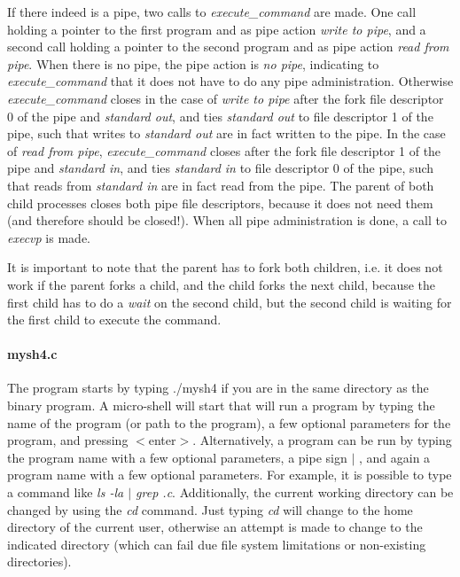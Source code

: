 \documentclass[a4paper,10pt]{article}
\begin{document}
If there indeed is a pipe, two calls to \emph{execute\_command} are made. One call holding a pointer to the first program and as pipe action \emph{write to pipe}, and a second call holding a pointer to the second program and as pipe action \emph{read from pipe}. When there is no pipe, the pipe action is \emph{no pipe}, indicating to \emph{execute\_command} that it does not have to do any pipe administration. Otherwise \emph{execute\_command} closes in the case of \emph{write to pipe} after the fork file descriptor 0 of the pipe and \emph{standard out}, and ties \emph{standard out} to file descriptor 1 of the pipe, such that writes to \emph{standard out} are in fact written to the pipe. In the case of \emph{read from pipe}, \emph{execute\_command} closes after the fork file descriptor 1 of the pipe and \emph{standard in}, and ties \emph{standard in} to file descriptor 0 of the pipe, such that reads from \emph{standard in} are in fact read from the pipe. The parent of both child processes closes both pipe file descriptors, because it does not need them (and therefore should be closed!). When all pipe administration is done, a call to \emph{execvp} is made.

It is important to note that the parent has to fork both children, i.e. it does not work if the parent forks a child, and the child forks the next child, because the first child has to do a \emph{wait} on the second child, but the second child is waiting for the first child to execute the command.

\paragraph{mysh4.c} The program starts by typing ./mysh4 if you are in the same directory as the binary program. A micro-shell will start that will run a program by typing the name of the program (or path to the program), a few optional parameters for the program, and pressing $<$enter$>$. Alternatively, a program can be run by typing the program name with a few optional parameters, a pipe sign $\mid$ , and again a program name with a few optional parameters. For example, it is possible to type a command like \emph{ls -la $\mid$ grep .c}. Additionally, the current working directory can be changed by using the \emph{cd} command. Just typing \emph{cd} will change to the home directory of the current user, otherwise an attempt is made to change to the indicated directory (which can fail due file system limitations or non-existing directories).
\end{document}
